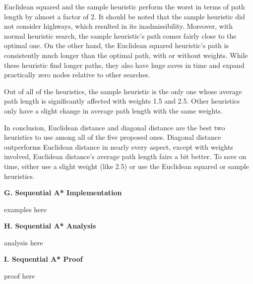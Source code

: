 \documentclass[12pt, letterpaper]{article}
\begin{document}
Euclidean squared and the sample heuristic perform the worst in terms of path length by almost a factor of 2. It should be noted that the sample heuristic did not consider highways, which resulted in its inadmissibility. Moreover, with normal heuristic search, the sample heuristic's path comes fairly close to the optimal one. On the other hand, the Euclidean squared heuristic's path is consistently much longer than the optimal path, with or without weights. While these heuristic find longer paths, they also have huge saves in time and expand practically zero nodes relative to other searches.

Out of all of the heuristics, the sample heuristic is the only one whose average path length is significantly affected with weights 1.5 and 2.5. Other heuristics only have a slight change in average path length with the same weights.


In conclusion, Euclidean distance and diagonal distance are the best two heuristics to use among all of the five proposed ones. Diagonal distance outperforms Euclidean distance in nearly every aspect, except with weights involved, Euclidean distance's average path length fairs a bit better. To save on time, either use a slight weight (like 2.5) or use the Euclidean squared or sample heuristics. 

\pagebreak %

\noindent \textbf{G. Sequential A* Implementation}

examples here

\pagebreak %

\noindent \textbf{H. Sequential A* Analysis}

analysis here

\pagebreak %

\noindent \textbf{I. Sequential A* Proof}

proof here
\end{document}
